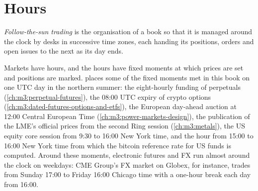 \section{Hours}

\begin{definition}\label{def:m3:a-map-of-all-markets:sun}
\emph{Follow-the-sun trading} is the organisation of a book so that it is managed around the clock by desks in successive time
zones, each handing its positions, orders and open issues to the next as its day ends.
\end{definition}

Markets have hours, and the hours have fixed moments at which prices are set and positions are marked.  places some of
the fixed moments met in this book on one UTC day in the northern summer: the eight-hourly funding of perpetuals (\cref{ch:m3:perpetual-futures}), the 08:00
UTC expiry of crypto options (\cref{ch:m3:dated-futures-options-and-etfs}), the European day-ahead auction at 12:00 Central European Time
(\cref{ch:m3:power-markets-design}), the publication of the LME's official prices from the second Ring session (\cref{ch:m3:metals}), the US equity core session
from 9:30 to 16:00 New York time, and the hour from 15:00 to 16:00 New York time from which the bitcoin reference rate for US funds is computed. Around
these moments, electronic futures and FX run almost around the clock on weekdays: CME Group's FX market on Globex, for instance, trades from
Sunday 17:00 to Friday 16:00 Chicago time with a one-hour break each day from 16:00.

